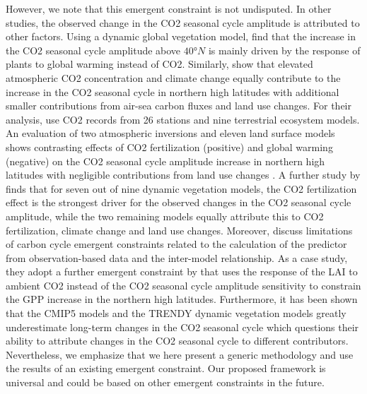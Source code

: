 However, we note that this emergent constraint is not undisputed. In other
studies, the observed change in the \ac{CO2} seasonal cycle amplitude is
attributed to other factors. Using a dynamic global vegetation model,
\textcite{Forkel2016} find that the increase in the \ac{CO2} seasonal cycle
amplitude above $40 \unit{\degree N}$ is mainly driven by the response of
plants to global warming instead of \ac{CO2}. Similarly, \textcite{Piao2018}
show that elevated atmospheric \acs{CO2} concentration and climate change
equally contribute to the increase in the \ac{CO2} seasonal cycle in northern
high latitudes with additional smaller contributions from air-sea carbon fluxes
and land use changes. For their analysis, \textcite{Piao2018} use \ac{CO2}
records from 26 stations and nine terrestrial ecosystem models. An evaluation
of two atmospheric inversions and eleven land surface models shows contrasting
effects of \ac{CO2} fertilization (positive) and global warming (negative) on
the \ac{CO2} seasonal cycle amplitude increase in northern high latitudes with
negligible contributions from land use changes \autocite{Bastos2019}. A further
study by \textcite{Zhao2016} finds that for seven out of nine dynamic
vegetation models, the \ac{CO2} fertilization effect is the strongest driver
for the observed changes in the \ac{CO2} seasonal cycle amplitude, while the
two remaining models equally attribute this to \ac{CO2} fertilization, climate
change and land use changes. Moreover, \textcite{Winkler2019a} discuss
limitations of carbon cycle emergent constraints related to the calculation of
the predictor from observation-based data and the inter-model relationship. As
a case study, they adopt a further emergent constraint by
\textcite{Winkler2019} that uses the response of the \ac{LAI} to ambient
\ac{CO2} instead of the \ac{CO2} seasonal cycle amplitude sensitivity to
constrain the \ac{GPP} increase in the northern high latitudes. Furthermore, it
has been shown that the \acs{CMIP}5 models \autocite{Graven2013} and the TRENDY
dynamic vegetation models \autocite{Thomas2016} greatly underestimate long-term
changes in the \ac{CO2} seasonal cycle which questions their ability to
attribute changes in the \ac{CO2} seasonal cycle to different contributors.
Nevertheless, we emphasize that we here present a generic methodology and use
the results of an existing emergent constraint. Our proposed framework is
universal and could be based on other emergent constraints in the future.

